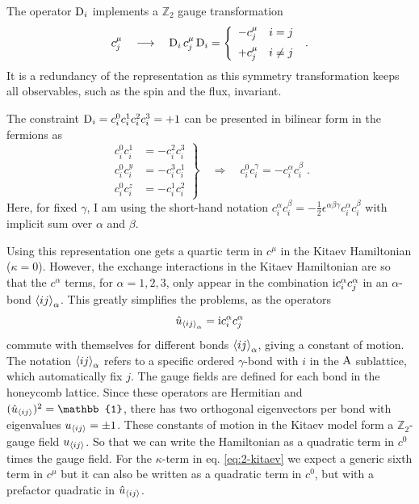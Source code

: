 The operator $\mathrm{D}_i$ implements a $\mathbb{Z}_2$ gauge transformation
\begin{equation}
    c_j^\mu \quad \longrightarrow \quad \rmD_i \,c_j^\mu\, \rmD_i = %
    \left\{\begin{array}{cc}   -c_j^\mu & i=j \\[6pt]   +c_j^\mu & i\neq j \end{array}\right. \;.
\end{equation}
It is a redundancy of the representation as this symmetry transformation keeps all observables, such as the spin and the flux, invariant.


The constraint $\mathrm{D}_i = c^0_ic^1_ic^2_ic^3_i=+1$  can be presented in bilinear form in the fermions as
\begin{equation}\left.
    \begin{array}{cc}
        c^0_i c^1_i &= - c^2_i c^3_i\\
        c^0_i c^y_i &= - c^3_i c^1_i \\
        c^0_i c^z_i &= - c^1_i c^2_i
    \end{array}\right\} \quad \Rightarrow \quad
        c^0_i c^\gamma_i = - c^\alpha_i c^\beta_i   \; .
\end{equation}
Here, for fixed $\gamma$, I am using the short-hand notation $c^\alpha_i c^\beta_i = -\frac{1}{2} \epsilon^{\alpha\beta\gamma} c^\alpha_i c^\beta_i$ with implicit sum over $\alpha$ and $\beta$.

Using this representation one gets a quartic term in $c^\mu$ in the Kitaev Hamiltonian ($\kappa=0$). However, the exchange interactions in the Kitaev Hamiltonian are so that the $c^\alpha$ terms, for $\alpha=1,2,3$, only appear in the combination $\mathrm{i} c_i^\alpha c_j^\alpha$ in an $\alpha$-bond $\braket{ij}_\alpha$. This greatly simplifies the problems, as the operators
\begin{equation}
    \hat{u}_{\braket{ij}_{\alpha} }= \mathrm{i} c_i^\alpha c_j^\alpha
\end{equation} commute with themselves for different bonds  $\braket{ij}_\alpha$, giving a constant of motion.
The notation $\braket{ij}_{\alpha}$ refers to a specific ordered $\gamma$-bond with $i$ in the $\mathrm{A}$ sublattice, which automatically fix $j$. The gauge fields are defined for each bond in the honeycomb lattice.
Since these operators are Hermitian and $(\hat u_{\braket{ij}})^2=\mathbb{1}$,  there has two orthogonal eigenvectors per bond with eigenvalues $u_{\braket{ij}} = \pm 1$.
These constants of motion in the Kitaev model form a $\mathbb{Z}_2$-gauge field $u_{\braket{ij}}$.
So that we can write the Hamiltonian as a quadratic term in $c^0$ times the gauge field.
For the $\kappa$-term in eq. \eqref{eq:2-kitaev} we expect a generic sixth term in $c^\mu$ but it can also be written as a quadratic term in $c^0$, but with a prefactor quadratic in $\hat{u}_{\braket{ij}}$.


